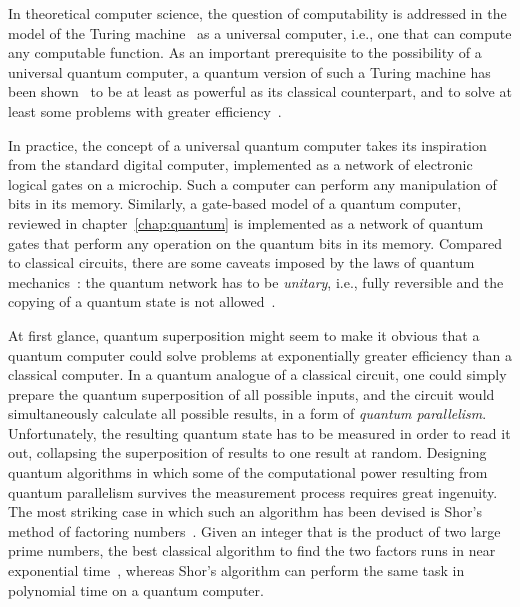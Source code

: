 In theoretical computer science, the question of computability is addressed in
the model of the Turing machine~\cite{TuringPLMS1937} as a universal computer,
i.e., one that can compute any computable function.
As an important prerequisite to the possibility of a universal quantum computer,
a quantum version of such a Turing machine has been shown~\cite{DeutschPRSA1985}
to be at least as powerful as its classical counterpart, and to solve
at least some problems with greater efficiency~\cite{KayeLaflammeMosca}.

In practice, the concept of a universal quantum computer takes its inspiration
from the standard digital computer, implemented as a network of electronic
logical gates on a microchip. Such a computer can perform any manipulation of
bits in its memory. Similarly, a gate-based model of a quantum computer,
reviewed in chapter~\ref{chap:quantum} is implemented as a network of quantum
gates that perform any operation on the quantum bits in its memory.
Compared to classical circuits, there are some caveats imposed by the laws of
quantum mechanics~\cite{NielsenChuang}: the quantum network has to be
\emph{unitary}, i.e., fully reversible and the copying of
a quantum state is not allowed~\cite{WoottersN1982}.

At first glance, quantum superposition might seem to make it obvious that
a quantum computer could solve problems at exponentially greater efficiency
than a classical computer. In a quantum analogue of a classical circuit, one could
simply prepare the quantum superposition of all possible inputs, and the circuit
would simultaneously calculate all possible results, in a form of \emph{quantum
parallelism}.
%
Unfortunately, the resulting quantum state has to be measured in order to read
it out, collapsing the superposition of results to one result at random.
Designing quantum algorithms in which some of the computational power resulting
from quantum parallelism survives the measurement process requires great
ingenuity.
The most striking case in which such an algorithm has been devised is Shor's
method of factoring numbers~\cite{ShorSJC1997}.
%
Given an integer that is the
product of two large prime numbers, the best classical algorithm to find the two
factors runs in near exponential time~\cite{PomeranceNAMS1996}, whereas Shor's
algorithm can perform the same task in polynomial time on a quantum computer.

